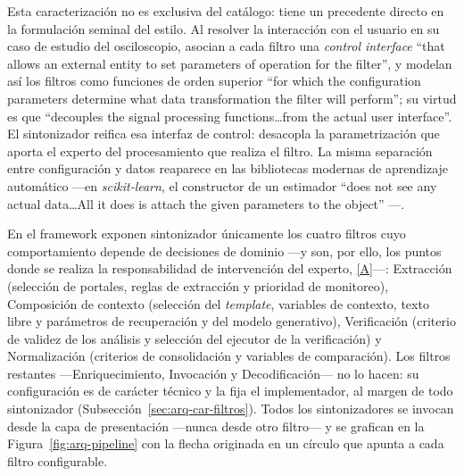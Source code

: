 \documentclass[12pt]{report}
\DeclareRobustCommand{\resp}[1]{\hyperref[tab:registro-responsabilidades]{\textcolor{respcolor}{[#1]}}}
\begin{document}
Esta caracterización no es exclusiva del catálogo: tiene un precedente directo en la formulación seminal del estilo. Al resolver la interacción con el usuario en su caso de estudio del osciloscopio, \citet{garlanshaw:1994} asocian a cada filtro una \textit{control interface} ``that allows an external entity to set parameters of operation for the filter'', y modelan así los filtros como funciones de orden superior ``for which the configuration parameters determine what data transformation the filter will perform''; su virtud es que ``decouples the signal processing functions\ldots from the actual user interface''. El sintonizador reifica esa interfaz de control: desacopla la parametrización que aporta el experto del procesamiento que realiza el filtro. La misma separación entre configuración y datos reaparece en las bibliotecas modernas de aprendizaje automático ---en \textit{scikit-learn}, el constructor de un estimador ``does not see any actual data\ldots All it does is attach the given parameters to the object'' \citep{buitinck:2013}---.

En el framework exponen sintonizador únicamente los cuatro filtros cuyo comportamiento depende de decisiones de dominio ---y son, por ello, los puntos donde se realiza la responsabilidad de intervención del experto, \resp{A}---: Extracción (selección de portales, reglas de extracción y prioridad de monitoreo), Composición de contexto (selección del \textit{template}, variables de contexto, texto libre y parámetros de recuperación y del modelo generativo), Verificación (criterio de validez de los análisis y selección del ejecutor de la verificación) y Normalización (criterios de consolidación y variables de comparación). Los filtros restantes ---Enriquecimiento, Invocación y Decodificación--- no lo hacen: su configuración es de carácter técnico y la fija el implementador, al margen de todo sintonizador (Subsección~\ref{sec:arq-car-filtros}). Todos los sintonizadores se invocan desde la capa de presentación ---nunca desde otro filtro--- y se grafican en la Figura~\ref{fig:arq-pipeline} con la flecha originada en un círculo que apunta a cada filtro configurable.
\end{document}
